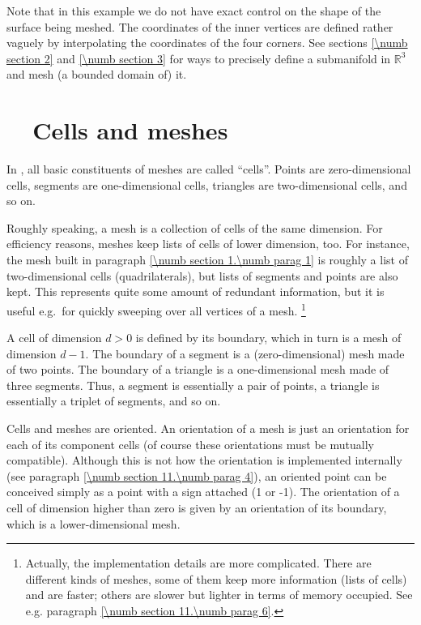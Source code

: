 Note that in this example we do not have exact control on the shape of the surface being meshed.
The coordinates of the inner vertices are defined rather vaguely by interpolating the
coordinates of the four corners.
See sections \ref{\numb section 2} and \ref{\numb section 3} for ways to precisely define
a submanifold in $ \mathbb{R}^3 $ and mesh (a bounded domain of) it.


\section{~~Cells and meshes}\label{\numb section 1.\numb parag 2}

In \maniFEM, all basic constituents of meshes are called ``cells''. 
Points are zero-dimensional cells, segments are one-dimensional cells, triangles are
two-dimensional cells, and so on.

Roughly speaking, a mesh is a collection of cells of the same dimension. 
For efficiency reasons, meshes keep lists of cells of lower dimension, too. 
For instance, the mesh built in paragraph \ref{\numb section 1.\numb parag 1} is 
roughly a list of two-dimensional cells (quadrilaterals), but lists of segments and points
are also kept.
This represents quite some amount of redundant information, but it is useful e.g.\ for
quickly sweeping over all vertices of a mesh.%
\footnote {{} Actually, the implementation details are more complicated.
There are different kinds of meshes, some of them keep more information (lists of cells)
and are faster; others are slower but lighter in terms of memory occupied.
See e.g. paragraph \ref{\numb section 11.\numb parag 6}.}

A cell of dimension $ d>0 $ is defined by its boundary, 
which in turn is a mesh of dimension $ d-1 $. 
The boundary of a segment is a (zero-dimensional) mesh made of two points.
The boundary of a triangle is a one-dimensional mesh made of three segments.
Thus, a segment is essentially a pair of points, a triangle is essentially a triplet of segments, and so on.

Cells and meshes are oriented. 
An orientation of a mesh is just an orientation for each of its component cells
(of course these orientations must be mutually compatible).
Although this is not how the orientation is implemented internally
(see paragraph \ref{\numb section 11.\numb parag 4}),
an oriented point can be conceived simply as a point with a sign attached (1 or -1). 
The orientation of a cell of dimension higher than zero is given by an orientation
of its boundary, which is a lower-dimensional mesh.

